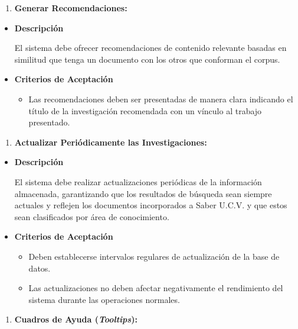 \documentclass[
  12pt,
  openany]{book}
\providecommand{\tightlist}{%
  \setlength{\itemsep}{0pt}\setlength{\parskip}{0pt}}
\begin{document}
\begin{enumerate}
\def\labelenumi{\arabic{enumi}.}
\setcounter{enumi}{5}
\tightlist
\item
  \textbf{Generar Recomendaciones:}
\end{enumerate}

\begin{itemize}
\item
  \textbf{Descripción}

  El sistema debe ofrecer recomendaciones de contenido relevante basadas en similitud que tenga un documento con los otros que conforman el corpus.
\item
  \textbf{Criterios de Aceptación}

  \begin{itemize}
  \tightlist
  \item
    Las recomendaciones deben ser presentadas de manera clara indicando el título de la investigación recomendada con un vínculo al trabajo presentado.
  \end{itemize}
\end{itemize}

\begin{enumerate}
\def\labelenumi{\arabic{enumi}.}
\setcounter{enumi}{6}
\tightlist
\item
  \textbf{Actualizar Periódicamente las Investigaciones:}
\end{enumerate}

\begin{itemize}
\item
  \textbf{Descripción}

  El sistema debe realizar actualizaciones periódicas de la información almacenada, garantizando que los resultados de búsqueda sean siempre actuales y reflejen los documentos incorporados a Saber U.C.V. y que estos sean clasificados por área de conocimiento.
\item
  \textbf{Criterios de Aceptación}

  \begin{itemize}
  \item
    Deben establecerse intervalos regulares de actualización de la base de datos.
  \item
    Las actualizaciones no deben afectar negativamente el rendimiento del sistema durante las operaciones normales.
  \end{itemize}
\end{itemize}

\begin{enumerate}
\def\labelenumi{\arabic{enumi}.}
\setcounter{enumi}{7}
\tightlist
\item
  \textbf{Cuadros de Ayuda (\emph{Tooltips}):}
\end{enumerate}
\end{document}
